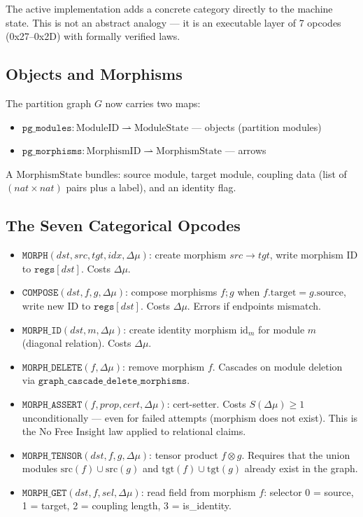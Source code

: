 \documentclass[11pt, a4paper]{report}
\theoremstyle{definition}
\theoremstyle{plain}
\begin{document}
The active implementation adds a concrete category directly to the machine state. This is not an abstract analogy — it is an executable layer of 7 opcodes (0x27--0x2D) with formally verified laws.

\subsection{Objects and Morphisms}

The partition graph $G$ now carries two maps:
\begin{itemize}
    \item $\texttt{pg\_modules} : \mathrm{ModuleID} \rightharpoonup \mathrm{ModuleState}$ — objects (partition modules)
    \item $\texttt{pg\_morphisms} : \mathrm{MorphismID} \rightharpoonup \mathrm{MorphismState}$ — arrows
\end{itemize}

A $\mathrm{MorphismState}$ bundles: source module, target module, coupling data (list of $(nat \times nat)$ pairs plus a label), and an identity flag.

\subsection{The Seven Categorical Opcodes}

\begin{itemize}
    \item $\texttt{MORPH}(dst, src, tgt, idx, \Delta\mu)$: create morphism $src \to tgt$, write morphism ID to $\texttt{regs}[dst]$. Costs $\Delta\mu$.
    \item $\texttt{COMPOSE}(dst, f, g, \Delta\mu)$: compose morphisms $f ; g$ when $f.\mathrm{target} = g.\mathrm{source}$, write new ID to $\texttt{regs}[dst]$. Costs $\Delta\mu$. Errors if endpoints mismatch.
    \item $\texttt{MORPH\_ID}(dst, m, \Delta\mu)$: create identity morphism $\mathrm{id}_m$ for module $m$ (diagonal relation). Costs $\Delta\mu$.
    \item $\texttt{MORPH\_DELETE}(f, \Delta\mu)$: remove morphism $f$. Cascades on module deletion via $\texttt{graph\_cascade\_delete\_morphisms}$.
    \item $\texttt{MORPH\_ASSERT}(f, \mathit{prop}, \mathit{cert}, \Delta\mu)$: cert-setter. Costs $S(\Delta\mu) \geq 1$ unconditionally — even for failed attempts (morphism does not exist). This is the No Free Insight law applied to relational claims.
    \item $\texttt{MORPH\_TENSOR}(dst, f, g, \Delta\mu)$: tensor product $f \otimes g$. Requires that the union modules $\mathrm{src}(f) \cup \mathrm{src}(g)$ and $\mathrm{tgt}(f) \cup \mathrm{tgt}(g)$ already exist in the graph.
    \item $\texttt{MORPH\_GET}(dst, f, \mathit{sel}, \Delta\mu)$: read field from morphism $f$: selector 0 = source, 1 = target, 2 = coupling length, 3 = is\_identity.
\end{itemize}
\end{document}
